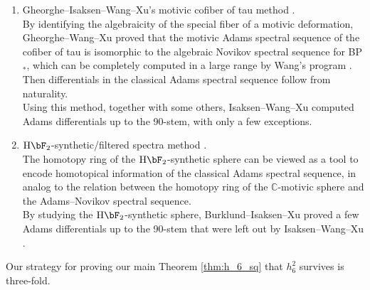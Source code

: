 \documentclass{amsart}
\numberwithin{equation}{section}
\newcommand{\HF}{\mathrm{H}\bF_2}
\begin{document}
\begin{enumerate}
    \noindent There is a nice geometric application of these differentials in stems 60 and 61. The sphere $S^{61}$ has a unique smooth structure and it is the last odd dimensional case: The only ones are $S^1, \ S^3, \ S^5$ and $S^{61}$.\\

    \item Gheorghe--Isaksen--Wang--Xu's motivic cofiber of tau method \cite{GWX, IWX}. \\

    \noindent By identifying the algebraicity of the special fiber of a motivic deformation, Gheorghe--Wang--Xu \cite{GWX} proved that the motivic Adams spectral sequence of the cofiber of tau is isomorphic to the algebraic Novikov spectral sequence for BP$_*$, which can be completely computed in a large range by Wang's program \cite{Wang}. Then differentials in the classical Adams spectral sequence follow from naturality.\\ 
    
    \noindent Using this method, together with some others, Isaksen--Wang--Xu \cite{IWX} computed Adams differentials up to the 90-stem, with only a few exceptions. \\

    \item $\HF$-synthetic/filtered spectra method \cite{Pst, Burklund, BurklundXu, BurklundIsaksenXu}.\\

    \noindent The homotopy ring of the $\HF$-synthetic sphere \cite{Pst, BHS} can be viewed as a tool to encode homotopical information of the classical Adams spectral sequence, in analog to the relation between the homotopy ring of the $\mathbb{C}$-motivic sphere \cite{Isaksen} and the Adams--Novikov spectral sequence. \\

    \noindent By studying the $\HF$-synthetic sphere, Burklund--Isaksen--Xu \cite{BurklundIsaksenXu} proved a few Adams differentials up to the 90-stem that were left out by Isaksen--Wang--Xu \cite{IWX}.\\

    
\end{enumerate}

Our strategy for proving our main Theorem \ref{thm:h_6_sq} that $h_6^2$ survives is three-fold. 
\end{document}
